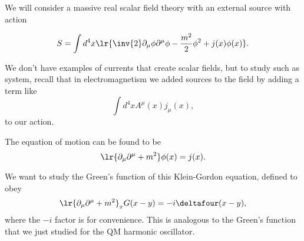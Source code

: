 We will consider a massive real scalar field theory with an external source with action

\begin{dmath}\label{eqn:qftLecture11:680}
S = \int d^4 x \lr{
\inv{2} \partial_\mu \phi \partial^\mu \phi - \frac{m^2}{2} \phi^2 + j(x) \phi(x)
}.
\end{dmath}

We don't have examples of currents that create scalar fields, but to study such as system, recall that
in electromagnetism we added sources to the field by adding a term like
\begin{dmath}\label{eqn:qftLecture11:700}
\int d^4 x A^\mu(x) j_\mu(x),
\end{dmath}
to our action.

The equation of motion can be found to be
\begin{dmath}\label{eqn:qftLecture11:720}
\lr{ \partial_\mu \partial^\mu + m^2 } \phi(x) = j(x).
\end{dmath}

We want to study the Green's function of this Klein-Gordon equation, defined to obey
\begin{dmath}\label{eqn:qftLecture11:740}
\lr{ \partial_\mu \partial^\mu + m^2 }_x G(x - y) = -i \deltafour(x - y),
\end{dmath}
where the \( -i \) factor is for convenience.
This is analogous to the Green's function that we just studied for the QM harmonic oscillator.



